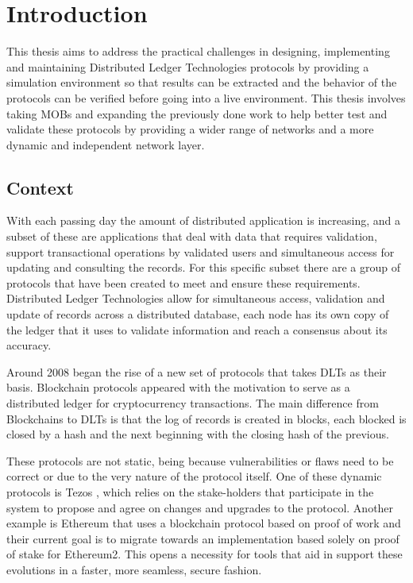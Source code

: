 
%

\chapter{Introduction}
\label{cha:introduction}

This thesis aims to address the practical challenges in designing, implementing and maintaining Distributed
Ledger Technologies protocols by providing a simulation environment so that results can be extracted and the behavior 
of the protocols can be verified before going into a live environment. This thesis involves taking MOBs and expanding
the previously done work to help better test and validate these protocols by providing a wider range of networks and
a more dynamic and independent network layer.


\section{Context}
\label{sub:context}
With each passing day the amount of distributed application is increasing, and a subset of these are applications that
deal with data that requires validation, support transactional operations by validated users and simultaneous access for updating and
consulting the records. For this specific subset there are a group of protocols that have been created to meet and ensure
these requirements. Distributed Ledger Technologies allow for simultaneous access, validation and update of records across
a distributed database, each node has its own copy of the ledger that it uses to validate information and reach a consensus
about its accuracy.

Around 2008 began the rise of a new set of protocols that takes DLTs as their basis. Blockchain protocols appeared with the motivation
to serve as a distributed ledger for cryptocurrency transactions. The main difference from Blockchains to DLTs is that
the log of records is created in blocks, each blocked is closed by a hash and the next beginning with the closing hash of the previous.

These protocols are not static, being because vulnerabilities or flaws need to be correct or due to the very nature of the protocol itself.
One of these dynamic protocols is Tezos \cite{tezos}, which relies on the stake-holders that participate in the system to propose and
agree on changes and upgrades to the protocol. Another example is Ethereum \cite{ethereum} that uses a blockchain protocol based on proof
of work and their current goal is to migrate towards an implementation based solely on proof of stake for Ethereum2.
This opens a necessity for tools that aid in support these evolutions in a faster, more seamless, secure fashion.

